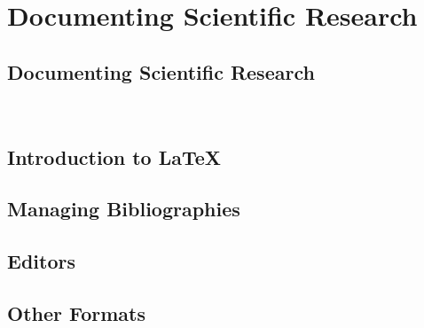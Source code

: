 \part{Documenting Scientific Research}


\chapter{Documenting Scientific Research}
\label{C:doc}

\FILENAME\







% 

\chapter{Introduction to \LaTeX}
\label{C:latex}



\chapter{Managing Bibliographies}
\label{C:bibtex}



\chapter{Editors}


\chapter{Other Formats}





%

